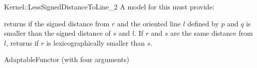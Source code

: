 \begin{ccRefFunctionObjectConcept}{Kernel::LessSignedDistanceToLine_2}
A model for this must provide:


{
returns  if the signed distance from $r$ and the oriented line $l$ 
defined by $p$ and $q$ is smaller than the signed distance of $s$ and $l$.  If
$r$ and $s$ are the same distance from $l$, returns  if $r$ is 
lexicographically smaller than $s$.
}

\ccRefines
AdaptableFunctor (with four arguments)

\ccSeeAlso
{}\\

\end{ccRefFunctionObjectConcept}
